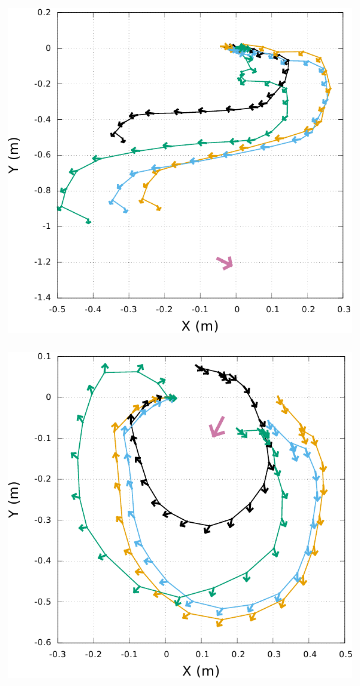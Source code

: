 \begin{figure}[htb]
\begin{subfigure}{0.28\paperwidth}
    \end{subfigure}
    \begin{subfigure}{0.28\paperwidth}
        \centering
        \includegraphics[type=pdf,ext=.pdf,read=.pdf,width=1.0\linewidth]{../plot/OdometryCMAES/ordersTraj5}
    \end{subfigure}
    \begin{subfigure}{0.28\paperwidth}
        \centering
        \includegraphics[type=pdf,ext=.pdf,read=.pdf,width=1.0\linewidth]{../plot/OdometryCMAES/ordersTraj6}

\end{subfigure}
\end{figure}
